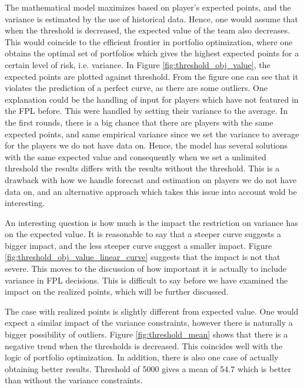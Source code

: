 \newpar

The mathematical model maximizes based on player's expected points, and the variance is estimated by the use of historical data. Hence, one would assume that when the threshold is decreased, the expected value of the team also decreases. This would coincide to the efficient frontier in portfolio optimization, where one obtains the optimal set of portfolios which gives the highest expected points for a certain level of risk, i.e. variance. In Figure \ref{fig:threshold_obj_value}, the expected points are plotted against threshold. From the figure one can see that it violates the prediction of a perfect curve, as there are some outliers. One explanation could be the handling of input for players which have not featured in the FPL before. This were handled by setting their variance to the average. In the first rounds, there is a big chance that there are players with the same expected points, and same empirical variance since we set the variance to average for the players we do not have data on. Hence, the model has several solutions with the same expected value and consequently when we set a unlimited threshold the results differs with the results without the threshold. This is a drawback with how we handle forecast and estimation on players we do not have data on, and an alternative approach which takes this issue into account wold be interesting. 

\newpar

An interesting question is how much is the impact the restriction on variance has on the expected value. It is reasonable to say that a steeper curve suggests a bigger impact, and the less steeper curve suggest a smaller impact. Figure \ref{fig:threshold_obj_value_linear_curve} suggests that the impact is not that severe. This moves to the discussion of how important it is actually to include variance in FPL decisions. This is difficult to say before we have examined the impact on the realized points, which will be further discussed. 

\newpar

The case with realized points is slightly different from expected value. One would expect a similar impact of the variance constraints, however there is naturally a bigger possibility of outliers. Figure \ref{fig:threshold_mean} shows that there is a negative trend when the thresholds is decreased. This coincides well with the logic of portfolio optimization. In addition, there is also one case of actually obtaining better results. Threshold of 5000 gives a mean of 54.7 which is better than without the variance constraints. 

